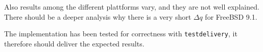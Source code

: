 \documentclass[12pt]{article}
\begin{document}
Also results among the different plattforms vary, and they are not well explained.
There should be a deeper analysis why there is a very short $\Delta q$ for FreeBSD 9.1.

The implementation has been tested for correctness with \texttt{testdelivery}, it therefore
should deliver the expected results.
\end{document}
